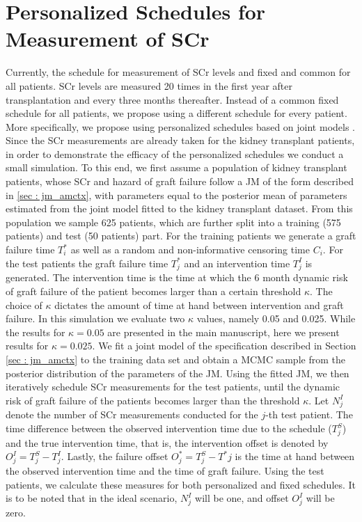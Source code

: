 \section{Personalized Schedules for Measurement of SCr}
\label{sec: simulation_study}
Currently, the schedule for measurement of SCr levels and fixed and common for all patients. SCr levels are measured 20 times in the first year after transplantation and every three months thereafter. Instead of a common fixed schedule for all patients, we propose using a different schedule for every patient. More specifically, we propose using personalized schedules based on joint models \citet{drizopoulosPersScreening}. Since the SCr measurements are already taken for the kidney transplant patients, in order to demonstrate the efficacy of the personalized schedules we conduct a small simulation. To this end, we first assume a population of kidney transplant patients, whose SCr and hazard of graft failure follow a JM of the form described in \ref{sec : jm_amctx}, with parameters equal to the posterior mean of parameters estimated from the joint model fitted to the kidney transplant dataset. From this population we sample 625 patients, which are further split into a training (575 patients) and test (50 patients) part. For the training patients we generate a graft failure time $T^*_i$ as well as a random and non-informative censoring time $C_i$. For the test patients the graft failure time $T^*_j$ and an intervention time $T^I_j$ is generated. The intervention time is the time at which the 6 month dynamic risk of graft failure of the patient becomes larger than a certain threshold $\kappa$. The choice of $\kappa$ dictates the amount of time at hand between intervention and graft failure. In this simulation we evaluate two $\kappa$ values, namely 0.05 and 0.025. While the results for $\kappa = 0.05$ are presented in the main manuscript, here we present results for $\kappa = 0.025$. We fit a joint model of the specification described in Section \ref{sec : jm_amctx} to the training data set and obtain a MCMC sample from the posterior distribution of the parameters of the JM. Using the fitted JM, we then iteratively schedule SCr measurements for the test patients, until the dynamic risk of graft failure \citep{rizopoulos2011dynamic} of the patients becomes larger than the threshold $\kappa$. Let $N^I_j$ denote the number of SCr measurements conducted for the $j$-th test patient. The time difference between the observed intervention time due to the schedule ($T^S_j$) and the true intervention time, that is, the intervention offset is denoted by $O^I_j = T^S_j - T^I_j$. Lastly, the failure offset $O^*_j = T^S_j - T^*j$ is the time at hand between the observed intervention time and the time of graft failure. Using the test patients, we calculate these measures for both personalized and fixed schedules. It is to be noted that in the ideal scenario, $N^I_j$ will be one, and offset $O^I_j$ will be zero. 

